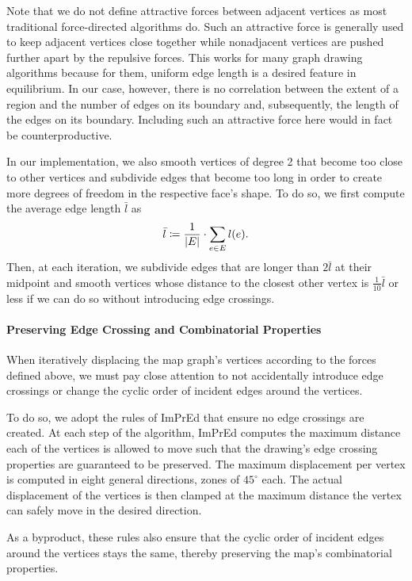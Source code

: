 Note that we do not define attractive forces between adjacent vertices as most traditional force-directed algorithms do.
Such an attractive force is generally used to keep adjacent vertices close together while nonadjacent vertices are pushed further apart by the repulsive forces.
This works for many graph drawing algorithms because for them, uniform edge length is a desired feature in equilibrium.
In our case, however, there is no correlation between the extent of a region and the number of edges on its boundary and, subsequently, the length of the edges on its boundary.
Including such an attractive force here would in fact be counterproductive.

In our implementation, we also smooth vertices of degree 2 that become too close to other vertices and subdivide edges that become too long in order to create more degrees of freedom in the respective face's shape.
To do so, we first compute the average edge length $\bar{l}$ as
%
\begin{equation*}
	\bar{l} \coloneqq \frac1{\left\lvert E\right\rvert} \cdot \sum\limits_{e \in E} l(e)
	.
\end{equation*}
%
Then, at each iteration, we subdivide edges that are longer than $2\bar{l}$ at their midpoint and smooth vertices whose distance to the closest other vertex is $\frac{1}{10}\bar{l}$ or less if we can do so without introducing edge crossings.



\paragraph{Preserving Edge Crossing and Combinatorial Properties}

When iteratively displacing the map graph's vertices according to the forces defined above, we must pay close attention to not accidentally introduce edge crossings or change the cyclic order of incident edges around the vertices.

To do so, we adopt the rules of ImPrEd \cite{simonetto2011impred} that ensure no edge crossings are created.
At each step of the algorithm, ImPrEd computes the maximum distance each of the vertices is allowed to move such that the drawing's edge crossing properties are guaranteed to be preserved.
The maximum displacement per vertex is computed in eight general directions, zones of $45^\circ$ each.
The actual displacement of the vertices is then clamped at the maximum distance the vertex can safely move in the desired direction.

As a byproduct, these rules also ensure that the cyclic order of incident edges around the vertices stays the same, thereby preserving the map's combinatorial properties.
